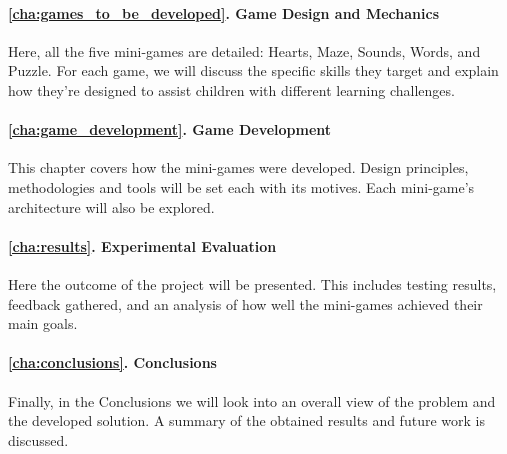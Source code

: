 \paragraph{\ref{cha:games_to_be_developed}. Game Design and Mechanics} Here, all the five mini-games are detailed: Hearts, Maze, Sounds, Words, and Puzzle. For each game, we will discuss the specific skills they target and explain how they’re designed to assist children with different learning challenges.

\paragraph{\ref{cha:game_development}. Game Development} This chapter covers how the mini-games were developed. Design principles, methodologies and tools will be set each with its motives. Each mini-game's architecture will also be explored.

\paragraph{\ref{cha:results}. Experimental Evaluation} Here the outcome of the project will be presented. This includes testing results, feedback gathered, and an analysis of how well the mini-games achieved their main goals.

\paragraph{\ref{cha:conclusions}. Conclusions} Finally, in the Conclusions we will look into an overall view of the problem and the developed solution. A summary of the obtained results and future work is discussed.


\newpage



